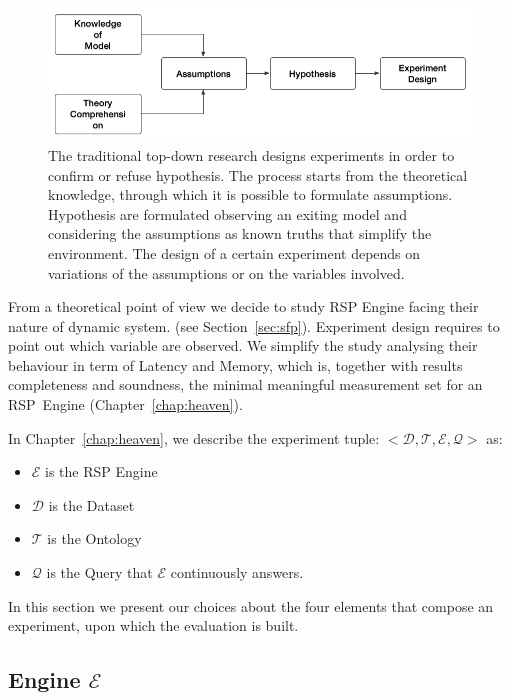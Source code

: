 \begin{figure}[tbh]
  \centering
	\includegraphics[width=\linewidth]{images/experiment-design}
	\caption[Experiment Design Process]{The traditional top-down research designs experiments in order to confirm or refuse hypothesis. The process starts from the theoretical knowledge, through which it is possible to formulate assumptions. Hypothesis are formulated observing an exiting model and considering the assumptions as known truths that simplify the environment. The design of a certain experiment depends on variations of the assumptions or on the variables involved.}
  	\label{fig:experiment-design}
\end{figure}

From a theoretical point of view we decide to study RSP Engine facing their nature of dynamic system. (see Section~\ref{sec:sfp}). Experiment design requires to point out which variable are observed. We simplify the study analysing their behaviour in term of Latency and Memory, which is, together with results completeness and soundness, the minimal meaningful measurement set for an RSP~Engine (Chapter~\ref{chap:heaven}).

In Chapter~\ref{chap:heaven}, we describe the experiment tuple: $<\mathcal{D}, \mathcal{T},\mathcal{E}, \mathcal{Q}>$ as:
\begin{itemize}
\item $\mathcal{E}$ is the RSP Engine
\item $\mathcal{D}$ is the Dataset 
\item $\mathcal{T}$ is the Ontology
\item $\mathcal{Q}$ is the Query that $\mathcal{E}$ continuously answers.
\end{itemize}

In this section we present our choices about the four elements that compose an experiment, upon which the evaluation is built.

\pagebreak

\subsection{Engine $\mathcal{E}$}

